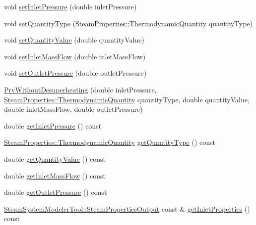 \begin{DoxyCompactItemize}
\item 
void \hyperlink{class_prv_without_desuperheating_a26039a0a228ca66f96e8402bf741b9d9}{set\+Inlet\+Pressure} (double inlet\+Pressure)
\item 
void \hyperlink{class_prv_without_desuperheating_a212177b7a16c7452358df4120196c04b}{set\+Quantity\+Type} (\hyperlink{class_steam_properties_ae0294bedf7d178c2d8fb6aed0f62fbff}{Steam\+Properties\+::\+Thermodynamic\+Quantity} quantity\+Type)
\item 
void \hyperlink{class_prv_without_desuperheating_a5ed2d0f0f558705d482ed0502131757f}{set\+Quantity\+Value} (double quantity\+Value)
\item 
void \hyperlink{class_prv_without_desuperheating_abeccff2dc91144452b34ca343ee63fa7}{set\+Inlet\+Mass\+Flow} (double inlet\+Mass\+Flow)
\item 
void \hyperlink{class_prv_without_desuperheating_a0f2a4597b58390e5c4a7c75b38bbebbc}{set\+Outlet\+Pressure} (double outlet\+Pressure)
\item 
\hyperlink{class_prv_without_desuperheating_a27a40131cc8567ec51bb8d6d522268c0}{Prv\+Without\+Desuperheating} (double inlet\+Pressure, \hyperlink{class_steam_properties_ae0294bedf7d178c2d8fb6aed0f62fbff}{Steam\+Properties\+::\+Thermodynamic\+Quantity} quantity\+Type, double quantity\+Value, double inlet\+Mass\+Flow, double outlet\+Pressure)
\item 
double \hyperlink{class_prv_without_desuperheating_a4b1244b479abfaef01abbb62395dff13}{get\+Inlet\+Pressure} () const
\item 
\hyperlink{class_steam_properties_ae0294bedf7d178c2d8fb6aed0f62fbff}{Steam\+Properties\+::\+Thermodynamic\+Quantity} \hyperlink{class_prv_without_desuperheating_ad465c855f0c7271110ed2cb2ebccf081}{get\+Quantity\+Type} () const
\item 
double \hyperlink{class_prv_without_desuperheating_a1113c254f45d08588b0afe4bd1273530}{get\+Quantity\+Value} () const
\item 
double \hyperlink{class_prv_without_desuperheating_a0ae2ed88cc8bd4e69cddc05ef1225811}{get\+Inlet\+Mass\+Flow} () const
\item 
double \hyperlink{class_prv_without_desuperheating_ae1d335703442deec2f2c2f93e4c862f2}{get\+Outlet\+Pressure} () const
\item 
\hyperlink{struct_steam_system_modeler_tool_1_1_steam_properties_output}{Steam\+System\+Modeler\+Tool\+::\+Steam\+Properties\+Output} const  \& \hyperlink{class_prv_without_desuperheating_aefb61f9d9dd99216459f6948308d11e9}{get\+Inlet\+Properties} () const

\end{DoxyCompactItemize}
